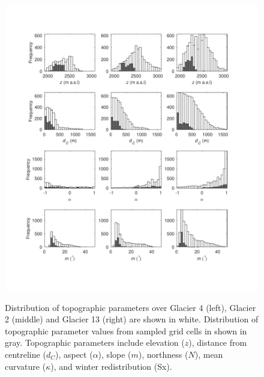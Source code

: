 \documentclass[twocolumn, letterpaper]{igs}
\begin{document}
\begin{figure}
	\centering
	\includegraphics[width =\textwidth]{TopoParamsSampled1.pdf}\\
	\caption{Distribution of topographic parameters over Glacier 4 (left), Glacier 2 (middle) and Glacier 13 (right) are shown in white. Distribution of topographic parameter values from sampled grid cells in shown in gray. Topographic parameters include elevation ($z$), distance from centreline ($d_C$), aspect ($\alpha$), slope ($m$), northness ($N$), mean curvature ($\kappa$), and winter redistribution (Sx).}
	\label{fig:TopoParamsSampled1}
\end{figure}
\end{document}
